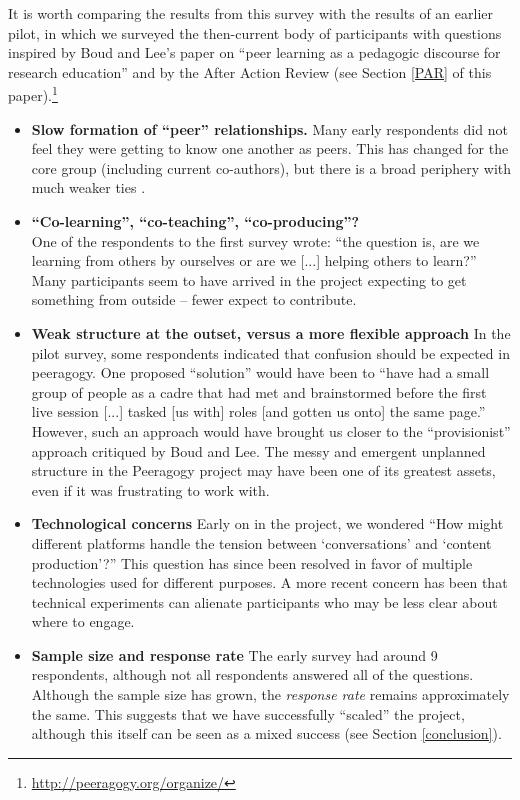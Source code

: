 \documentclass{acm_proc_article-sp}
\begin{document}
It is worth comparing the results from this survey with the results of an earlier pilot, in which we surveyed the then-current body of participants with questions inspired by Boud and Lee's paper on ``peer learning as a pedagogic discourse for research education'' \cite{boud2005peer} and by the After Action Review (see Section \ref{PAR} of this paper).\footnote{\url{http://peeragogy.org/organize/}}
\begin{itemize}
\item {\bf Slow formation of ``peer'' relationships.}  Many early respondents did not feel they were getting to know one another as peers. This has changed for the core group (including current co-authors), but there is a broad periphery with much weaker ties \cite{weak}.
\item {\bf ``Co-learning'', ``co-teaching'', ``co-producing''?} \\ One of the respondents to the first survey wrote: ``the question is, are we learning from others by ourselves or are we [...] helping others to learn?'' Many participants seem to have arrived in the project expecting to get something from outside -- fewer expect to contribute. 
\item {\bf Weak structure at the outset, versus a more flexible approach}  In the pilot survey, some respondents indicated that confusion should be expected in peeragogy. One proposed ``solution'' would have been to ``have had a small group of people as a cadre that had met and brainstormed before the first live session [...] tasked [us with] roles [and gotten us onto] the same page.'' However, such an approach would have brought us closer to the ``provisionist'' approach critiqued by Boud and Lee. The messy and emergent unplanned structure in the Peeragogy project may have been one of its greatest assets, even if it was frustrating to work with.
\item {\bf Technological concerns}  Early on in the project, we wondered ``How might different platforms handle the tension between `conversations' and `content production'?'' This question has since been resolved in favor of multiple technologies used for different purposes. A more recent concern has been that technical experiments can alienate participants who may be less clear about where to engage. 
\item {\bf Sample size and response rate}  The early survey had around 9 respondents, although not all respondents answered all of the questions. Although the sample size has grown, the \emph{response rate} remains approximately the same. This suggests that we have successfully ``scaled'' the project, although this itself can be seen as a mixed success (see Section \ref{conclusion}).
\end{itemize}
\end{document}
